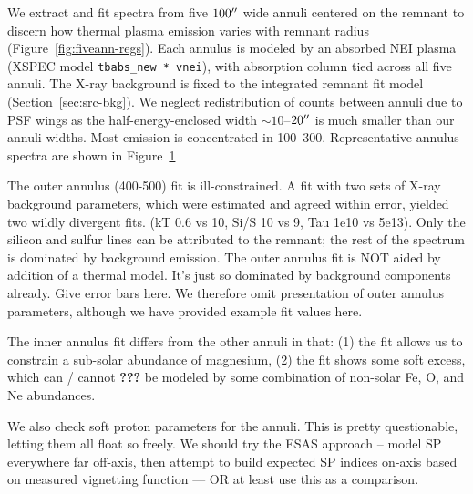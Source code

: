 \documentclass[preprint2,tighten,trackchanges]{aastex6}
\newcommand*{\abt}{\mathord{\sim}} %
\begin{document}
We extract and fit spectra from five $100\mbox{$^{\prime\prime}$}$ wide annuli centered on the
remnant to discern how thermal plasma emission varies with remnant radius
(Figure~\ref{fig:fiveann-regs}).
Each annulus is modeled by an absorbed NEI plasma
(XSPEC model \texttt{tbabs\_new * vnei}), with absorption column tied across
all five annuli.
The X-ray background is fixed to the integrated remnant fit model
(Section~\ref{sec:src-bkg}).
We neglect redistribution of counts between annuli due to PSF wings as the
half-energy-enclosed width $\abt10$--$20\mbox{$^{\prime\prime}$}$ is much smaller than our
annuli widths.
Most emission is concentrated in 100\arcsec--300\arcsec.
Representative annulus spectra are shown in Figure~\ref{fig:annuli-spectra}

\begin{figure*}[]
    \label{fig:annuli-spectra}  %
\end{figure*}

The outer annulus (400-500\arcsec) fit is ill-constrained.
A fit with two sets of X-ray background parameters, which were estimated and
agreed within error, yielded two wildly divergent fits.
(kT 0.6 vs 10, Si/S 10 vs 9, Tau 1e10 vs 5e13).
Only the silicon and sulfur lines can be attributed to the remnant; the rest of
the spectrum is dominated by background emission.
The outer annulus fit is NOT aided by addition of a thermal model.
It's just so dominated by background components already.
Give error bars here.
We therefore omit presentation of outer annulus parameters,
although we have provided example fit values here.

The inner annulus fit differs from the other annuli in that:
(1) the fit allows us to constrain a sub-solar abundance of magnesium,
(2) the fit shows some soft excess, which can / cannot \textbf{???} %
    be modeled by some combination of non-solar Fe, O, and Ne abundances.


We also check soft proton parameters for the annuli.
This is pretty questionable, letting them all float so freely.
We should try the ESAS approach -- model SP everywhere far off-axis,
then attempt to build expected SP indices on-axis based on measured vignetting
function --- OR at least use this as a comparison.
\end{document}
